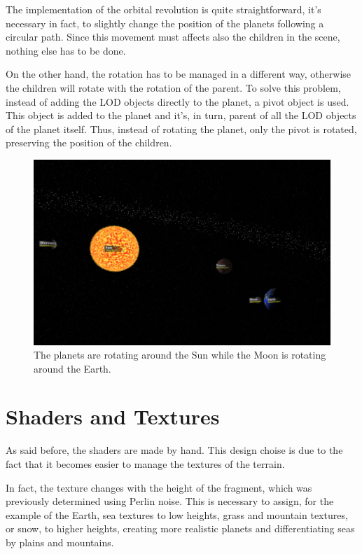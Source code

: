 \documentclass[paper=a4, fontsize=11pt]{scrartcl} %
\numberwithin{equation}{section} %
\numberwithin{figure}{section} %
\numberwithin{table}{section} %
\theoremstyle{definition}
\begin{document}
The implementation of the orbital revolution is quite straightforward, it's necessary
in fact, to slightly change the position of the planets following a
circular path. Since this movement must affects also the children in the scene,
nothing else has to be done.

On the other hand, the rotation has to be
managed in a different way, otherwise the children will rotate with the
rotation of the parent. To solve this problem, instead of adding the LOD objects
directly to the planet, a pivot object is used. This object is added to the
planet and it's, in turn, parent of all the LOD objects of the planet itself.
Thus, instead of
rotating the planet, only the pivot is rotated, preserving the position of
the children.

\begin{figure}
	\centering
	\includegraphics[scale=0.22]{images/solar_system.png}
	\caption{The planets are rotating around the Sun while the Moon is
		rotating around the Earth.}
	\label{fig:solar-system}
\end{figure}


\section{Shaders and Textures}

As said before, the shaders are made by hand. This design choise is due to
the fact that it becomes easier to manage the textures of the terrain.

In fact, the texture changes with the height of the fragment, which was previously
determined using Perlin noise. This is necessary to assign, for the example
of the Earth, sea textures to low
heights, grass and mountain textures, or snow, to higher heights, creating
more realistic planets and differentiating seas by plains and mountains.
\end{document}
